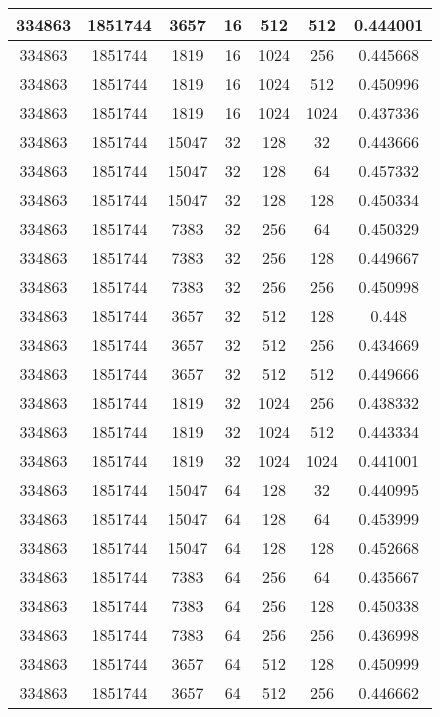\documentclass[9pt]{article}
\begin{document}
\begin{tabular}{|c|c|c|c|c|c|c| }
\hline
334863  & 1851744  & 3657  & 16  & 512  & 512  & 0.444001 \\
\hline
334863  & 1851744  & 1819  & 16  & 1024  & 256  & 0.445668 \\
\hline
334863  & 1851744  & 1819  & 16  & 1024  & 512  & 0.450996 \\
\hline
334863  & 1851744  & 1819  & 16  & 1024  & 1024  & 0.437336 \\
\hline
334863  & 1851744  & 15047  & 32  & 128  & 32  & 0.443666 \\
\hline
334863  & 1851744  & 15047  & 32  & 128  & 64  & 0.457332 \\
\hline
334863  & 1851744  & 15047  & 32  & 128  & 128  & 0.450334 \\
\hline
334863  & 1851744  & 7383  & 32  & 256  & 64  & 0.450329 \\
\hline
334863  & 1851744  & 7383  & 32  & 256  & 128  & 0.449667 \\
\hline
334863  & 1851744  & 7383  & 32  & 256  & 256  & 0.450998 \\
\hline
334863  & 1851744  & 3657  & 32  & 512  & 128  & 0.448 \\
\hline
334863  & 1851744  & 3657  & 32  & 512  & 256  & 0.434669 \\
\hline
334863  & 1851744  & 3657  & 32  & 512  & 512  & 0.449666 \\
\hline
334863  & 1851744  & 1819  & 32  & 1024  & 256  & 0.438332 \\
\hline
334863  & 1851744  & 1819  & 32  & 1024  & 512  & 0.443334 \\
\hline
334863  & 1851744  & 1819  & 32  & 1024  & 1024  & 0.441001 \\
\hline
334863  & 1851744  & 15047  & 64  & 128  & 32  & 0.440995 \\
\hline
334863  & 1851744  & 15047  & 64  & 128  & 64  & 0.453999 \\
\hline
334863  & 1851744  & 15047  & 64  & 128  & 128  & 0.452668 \\
\hline
334863  & 1851744  & 7383  & 64  & 256  & 64  & 0.435667 \\
\hline
334863  & 1851744  & 7383  & 64  & 256  & 128  & 0.450338 \\
\hline
334863  & 1851744  & 7383  & 64  & 256  & 256  & 0.436998 \\
\hline
334863  & 1851744  & 3657  & 64  & 512  & 128  & 0.450999 \\
\hline
334863  & 1851744  & 3657  & 64  & 512  & 256  & 0.446662 \\
\hline

\end{tabular}
\end{document}
